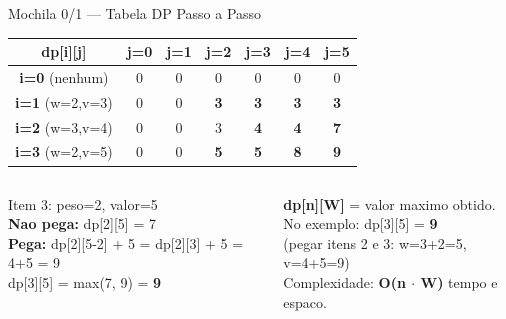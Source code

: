 \documentclass[aspectratio=169,10pt]{beamer}
\newcommand{\cDP}[1]{%
  \cellcolor{cellBase}\footnotesize #1}
\newcommand{\cDPh}[1]{%
  \cellcolor{cellHigh}\footnotesize\bfseries #1}
\begin{document}
\begin{frame}[shrink=3]{Mochila 0/1 --- Tabela DP Passo a Passo}
  \begin{tcolorbox}[caixaAzul,title={Itens: (w=2,v=3), (w=3,v=4), (w=2,v=5) --- Capacidade W=5}]
    \centering\footnotesize
    \setlength{\tabcolsep}{3pt}
    \begin{tabular}{c|cccccc}
      \toprule
      \rowcolor{gemaBlue!15}
      \textbf{dp[i][j]} & \textbf{j=0} & \textbf{j=1} & \textbf{j=2} & \textbf{j=3} & \textbf{j=4} & \textbf{j=5}\\
      \midrule
      \textbf{i=0} (nenhum) & \cDP{0} & \cDP{0} & \cDP{0} & \cDP{0} & \cDP{0} & \cDP{0}\\
      \textbf{i=1} (w=2,v=3) & \cDP{0} & \cDP{0} & \cDPh{3} & \cDPh{3} & \cDPh{3} & \cDPh{3}\\
      \textbf{i=2} (w=3,v=4) & \cDP{0} & \cDP{0} & \cDP{3} & \cDPh{4} & \cDPh{4} & \cDPh{7}\\
      \textbf{i=3} (w=2,v=5) & \cDP{0} & \cDP{0} & \cDPh{5} & \cDPh{5} & \cDPh{8} & \cDPh{9}\\
      \bottomrule
    \end{tabular}
  \end{tcolorbox}
  \vspace{0.08cm}
  \begin{columns}[t]
      \begin{tcolorbox}[caixaTeal,title={Como preencher dp[3][5]?}]
        \footnotesize
        Item 3: peso=2, valor=5\\[2pt]
        \textbf{Nao pega:} dp[2][5] = 7\\
        \textbf{Pega:} dp[2][5-2] + 5 = dp[2][3] + 5 = 4+5 = 9\\[2pt]
        dp[3][5] = max(7, 9) = \textbf{9}
      \end{tcolorbox}
      \begin{tcolorbox}[caixaVerde,title={Resposta}]
        \footnotesize
        \textbf{dp[n][W]} = valor maximo obtido.\\[2pt]
        No exemplo: dp[3][5] = \textbf{9}\\[2pt]
        (pegar itens 2 e 3: w=3+2=5, v=4+5=9)\\[2pt]
        Complexidade: \textbf{O(n $\cdot$ W)} tempo e espaco.
      \end{tcolorbox}
  \end{columns}
\end{frame}
\end{document}
